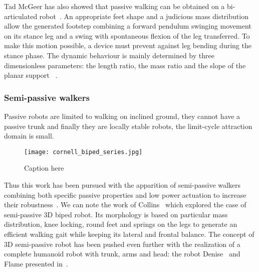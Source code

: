 Tad McGeer has also showed that passive walking can be obtained on a bi-articulated robot~\cite{mcgeer1992principles}. An appropriate feet shape and a judicious mass distribution allow the generated footstep combining a forward pendulum swinging movement on its stance leg and a swing with spontaneous flexion of the leg transferred. To make this motion possible, a device must prevent against leg bending during the stance phase.
The dynamic behaviour is mainly determined by three dimensionless parameters: the length ratio, the mass ratio and the slope of the planar support ~\cite{Garcia1998}.


\subsubsection{Semi-passive walkers} %
Passive robots are limited to walking on inclined ground, they cannot have a passive trunk and finally they are locally stable robots, the limit-cycle attraction domain is small.

\begin{figure}[tb]
    \begin{center}
        \texttt{[image: cornell\_biped\_series.jpg]}
    \end{center}
    \caption{Caption here}
    \label{fig:figure1}
\end{figure}

Thus this work has been pursued with the apparition of semi-passive walkers combining both specific passive properties and low power actuation to increase their robustness~\cite{Anderson2005}. We can note the work of Collins~\cite{collins2005bipedal} which explored the case of semi-passive 3D biped robot. Its morphology is based on particular mass distribution, knee locking, round feet and springs on the legs to generate an efficient walking gait while keeping its lateral and frontal balance. The concept of 3D semi-passive robot has been pushed even further with the realization of a complete humanoid robot with trunk, arms and head: the robot Denise~\cite{wisse2005three} and Flame presented in~\cite{Hobbelen2008}.



